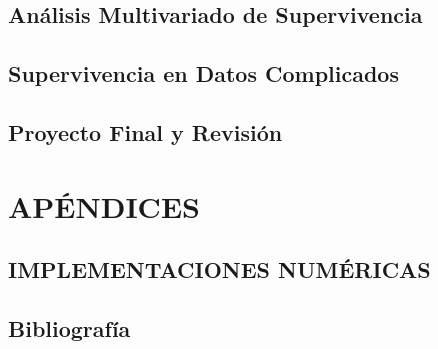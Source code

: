 \documentclass{report}
\begin{document}
\chapter{An\'alisis Multivariado de Supervivencia}


\chapter{Supervivencia en Datos Complicados}


\chapter{Proyecto Final y Revisi\'on}


\part{APÉNDICES}
\chapter{IMPLEMENTACIONES NUM\'ERICAS}


\chapter{Bibliografía}

\end{document}
